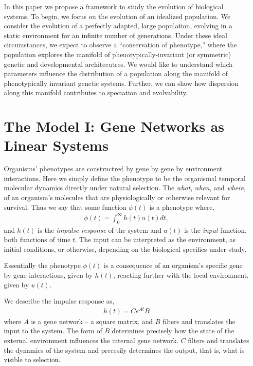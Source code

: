 \documentclass[9 pt]{article}
\newcommand{\1}{\mathbbm{1}}
\begin{document}
\begin{multicols}{2}
In this paper we propose a framework to study the evolution of biological systems. To begin, we focus on the evolution of an idealized population. We consider the evolution of a perfectly adapted, large population, evolving in a static environment for an infinite number of generations. Under these ideal circumstances, we expect to observe a ``conservation of phenotype,'' where the population explores the manifold of phenotypically-invariant (or symmetric) genetic and developmental architecutres. We would like to understand which parameters influence the distribution of a population along the manifold of phenotypically invariant genetic systems. Further, we can show how dispersion along this manifold contributes to speciation and evolvability. 

\section*{The Model I: Gene Networks as Linear Systems}

  Organisms' phenotypes are constructred by gene by gene by environment interactions. Here we simply define the phenotype to be the organismal temporal molecular dynamics directly under natural selection. The \emph{what}, \emph{when}, and \emph{where}, of an organism's molecules that are physiologically or otherwise relevant for survival. Thus we say that some function $\phi(t)$ is a phenotype where, 
  \begin{align}
    \phi(t) = \int_{0}^{\infty} h(t) u(t) dt  ,
  \end{align}
  and $h(t)$ is the \emph{impulse response} of the system and $u(t)$ is the \emph{input} function, both functions of time $t$. The input can be interpreted as the environment, as initial conditions, or otherwise, depending on the biological specifics under study. 

  Essentially the phenotype $\phi(t)$ is a consequence of an organism's specific gene by gene interactions, given by $h(t)$, reacting further with the local environment, given by $u(t)$. 

  We describe the impulse response as, 
  \begin{align}
    h(t) = C e^{A t} B
  \end{align}
  where $A$ is a gene network -- a square matrix, and $B$ filters and translates the input to the system. The form of $B$ determines precisely how the state of the external environment influences the internal gene network. $C$ filters and translates the dynamics of the system and precesily determines the output, that is, what is visible to selection. 


\end{multicols}
\end{document}
